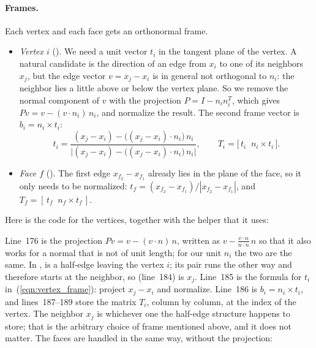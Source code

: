 \paragraph{Frames.} Each vertex and each face gets an orthonormal frame.
\begin{itemize}
\item \emph{Vertex $i$} (). We need a unit vector $t_i$ in the tangent plane of the vertex. A natural candidate is the direction of an edge from $x_i$ to one of its neighbors $x_j$, but the edge vector $v = x_j - x_i$ is in general not orthogonal to $n_i$: the neighbor lies a little above or below the vertex plane. So we remove the normal component of $v$ with the projection $P = I - n_i n_i^T$, which gives $P v = v - (v\cdot n_i)\, n_i$, and normalize the result. The second frame vector is $b_i = n_i \times t_i$:
\begin{equation}
\label{eqn:vertex_frame}
t_i = \frac{(x_j - x_i) - \big((x_j - x_i) \cdot n_i\big)\, n_i}{\big|(x_j - x_i) - \big((x_j - x_i) \cdot n_i\big)\, n_i\big|}, \qquad T_i = \big[\, t_i \;\; n_i \times t_i \,\big].
\end{equation}
\item \emph{Face $f$} (). The first edge $x_{f_2} - x_{f_1}$ already lies in the plane of the face, so it only needs to be normalized: $t_f = (x_{f_2} - x_{f_1})/|x_{f_2} - x_{f_1}|$, and $T_f = [\, t_f \;\; n_f \times t_f \,]$.
\end{itemize}
Here is the code for the vertices, together with the helper  that it uses:

Line~176 is the projection $P v = v - (v\cdot n)\, n$, written as $v - \frac{v\cdot n}{n\cdot n}\, n$ so that it also works for a normal that is not of unit length; for our unit $n_i$ the two are the same. In ,  is a half-edge leaving the vertex $i$; its pair runs the other way and therefore starts at the neighbor, so  (line~184) is $x_j$. Line~185 is the formula for $t_i$ in~(\ref{eqn:vertex_frame}): project $x_j - x_i$ and normalize. Line~186 is $b_i = n_i \times t_i$, and lines~187--189 store the matrix $T_i$, column by column, at the index  of the vertex. The neighbor $x_j$ is whichever one the half-edge structure happens to store; that is the arbitrary choice of frame mentioned above, and it does not matter. The faces are handled in the same way, without the projection:
